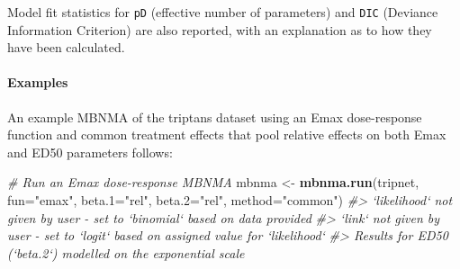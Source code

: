 \documentclass[]{article}
\newenvironment{Shaded}{\begin{snugshade}}{\end{snugshade}}
\newcommand{\CommentTok}[1]{\textcolor[rgb]{0.56,0.35,0.01}{\textit{#1}}}
\newcommand{\DataTypeTok}[1]{\textcolor[rgb]{0.13,0.29,0.53}{#1}}
\newcommand{\KeywordTok}[1]{\textcolor[rgb]{0.13,0.29,0.53}{\textbf{#1}}}
\newcommand{\NormalTok}[1]{#1}
\newcommand{\StringTok}[1]{\textcolor[rgb]{0.31,0.60,0.02}{#1}}
\let\oldparagraph\paragraph
\renewcommand{\paragraph}[1]{\oldparagraph{#1}\mbox{}}
\begin{document}
Model fit statistics for \texttt{pD} (effective number of parameters)
and \texttt{DIC} (Deviance Information Criterion) are also reported,
with an explanation as to how they have been calculated.

\hypertarget{examples}{%
\paragraph{Examples}\label{examples}}

An example MBNMA of the triptans dataset using an Emax dose-response
function and common treatment effects that pool relative effects on both
Emax and ED50 parameters follows:

\begin{Shaded}
\begin{Highlighting}[]
\CommentTok{# Run an Emax dose-response MBNMA}
\NormalTok{mbnma <-}\StringTok{ }\KeywordTok{mbnma.run}\NormalTok{(tripnet, }\DataTypeTok{fun=}\StringTok{"emax"}\NormalTok{, }
                   \DataTypeTok{beta.1=}\StringTok{"rel"}\NormalTok{, }\DataTypeTok{beta.2=}\StringTok{"rel"}\NormalTok{, }\DataTypeTok{method=}\StringTok{"common"}\NormalTok{)}
\CommentTok{#> `likelihood` not given by user - set to `binomial` based on data provided}
\CommentTok{#> `link` not given by user - set to `logit` based on assigned value for `likelihood`}
\CommentTok{#> Results for ED50 (`beta.2`) modelled on the exponential scale}
\end{Highlighting}
\end{Shaded}
\end{document}
